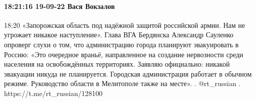 \paragraph{18:21:16 19-09-22 Вася Вокзалов}
18:20
«Запорожская область под надёжной защитой российской армии. Нам не угрожает никакое наступление».
Глава ВГА Бердянска Александр Сауленко опроверг слухи о том, что администрацию города планируют эвакуировать в Россию:
«Это очередное враньё, направленное на создание нервозности среди населения на освобождённых территориях. Заявляю официально: никакой эвакуации никуда не планируется. Городская администрация работает в обычном режиме. Руководство области в Мелитополе также на месте».
.
@rt_russian
.
https://t.me/rt_russian/128100
